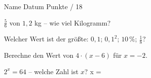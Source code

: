\documentclass[11pt]{article}
\begin{document}
{}
\par\vspace{2pt}\noindent Name \underline{\hspace{7cm}}\hfill Datum \underline{\hspace{3cm}}\hfill Punkte \underline{\hspace{1.2cm}} / 18\par\vspace{6pt}
\small

\noindent\begin{minipage}[t]{0.485\linewidth}\raggedright
\begin{aufgabe}{$\frac{5}{6}$ von $1{,}2$ kg – wie viel Kilogramm? \leerfeld[kg]}
\end{aufgabe}
\end{minipage}\hfill\begin{minipage}[t]{0.485\linewidth}\raggedright
\begin{aufgabe}{Welcher Wert ist der größte: $0{,}1$; $0{,}1^2$; $10\,\%$; $\frac{1}{8}$? \leerfeld}
\end{aufgabe}
\end{minipage}\par

\noindent\begin{minipage}[t]{0.485\linewidth}\raggedright
\begin{aufgabe}{Berechne den Wert von $4 \cdot (x - 6)$ für $x = -2$. \leerfeld}
\end{aufgabe}
\end{minipage}\hfill\begin{minipage}[t]{0.485\linewidth}\raggedright
\begin{aufgabe}{$2^x = 64$ – welche Zahl ist $x$? x = \leerfeld}
\end{aufgabe}
\end{minipage}\par
\end{document}
